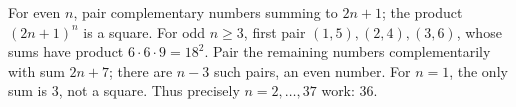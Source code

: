 For even $n$, pair complementary numbers summing to $2n+1$; the product $(2n+1)^n$ is a square. For odd $n\ge3$, first pair $(1,5),(2,4),(3,6)$, whose sums have product $6\cdot6\cdot9=18^2$. Pair the remaining numbers complementarily with sum $2n+7$; there are $n-3$ such pairs, an even number. For $n=1$, the only sum is $3$, not a square. Thus precisely $n=2,\ldots,37$ work: $\boxed{36}$.
